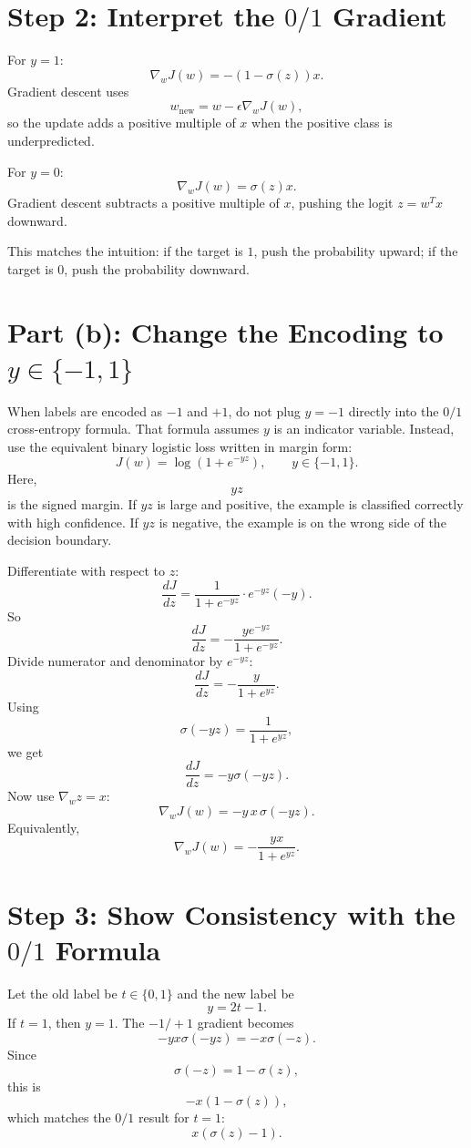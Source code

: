 \documentclass[11pt]{article}
\begin{document}
\section*{Step 2: Interpret the $0/1$ Gradient}

For $y=1$:
\[
\nabla_w J(w)=-(1-\sigma(z))x.
\]
Gradient descent uses
\[
w_{\text{new}}=w-\epsilon\nabla_wJ(w),
\]
so the update adds a positive multiple of $x$ when the positive class is underpredicted.

For $y=0$:
\[
\nabla_w J(w)=\sigma(z)x.
\]
Gradient descent subtracts a positive multiple of $x$, pushing the logit $z=w^Tx$ downward.

This matches the intuition: if the target is $1$, push the probability upward; if the target is $0$, push the probability downward.

\section*{Part (b): Change the Encoding to $y\in\{-1,1\}$}

When labels are encoded as $-1$ and $+1$, do not plug $y=-1$ directly into the $0/1$ cross-entropy formula. That formula assumes $y$ is an indicator variable. Instead, use the equivalent binary logistic loss written in margin form:
\[
J(w)=\log(1+e^{-yz}),
\qquad
y\in\{-1,1\}.
\]
Here,
\[
yz
\]
is the signed margin. If $yz$ is large and positive, the example is classified correctly with high confidence. If $yz$ is negative, the example is on the wrong side of the decision boundary.

Differentiate with respect to $z$:
\[
\frac{dJ}{dz}
=
\frac{1}{1+e^{-yz}}\cdot e^{-yz}(-y).
\]
So
\[
\frac{dJ}{dz}
=
-\frac{y e^{-yz}}{1+e^{-yz}}.
\]
Divide numerator and denominator by $e^{-yz}$:
\[
\frac{dJ}{dz}
=
-\frac{y}{1+e^{yz}}.
\]
Using
\[
\sigma(-yz)=\frac{1}{1+e^{yz}},
\]
we get
\[
\frac{dJ}{dz}=-y\sigma(-yz).
\]
Now use $\nabla_wz=x$:
\[
\boxed{
\nabla_w J(w)
=
-y\,x\,\sigma(-yz)
}.
\]
Equivalently,
\[
\boxed{
\nabla_w J(w)
=
-\frac{yx}{1+e^{yz}}
}.
\]

\section*{Step 3: Show Consistency with the $0/1$ Formula}

Let the old label be $t\in\{0,1\}$ and the new label be
\[
y=2t-1.
\]
If $t=1$, then $y=1$. The $-1/+1$ gradient becomes
\[
-y x\sigma(-yz)=-x\sigma(-z).
\]
Since
\[
\sigma(-z)=1-\sigma(z),
\]
this is
\[
-x(1-\sigma(z)),
\]
which matches the $0/1$ result for $t=1$:
\[
x(\sigma(z)-1).
\]
\end{document}
